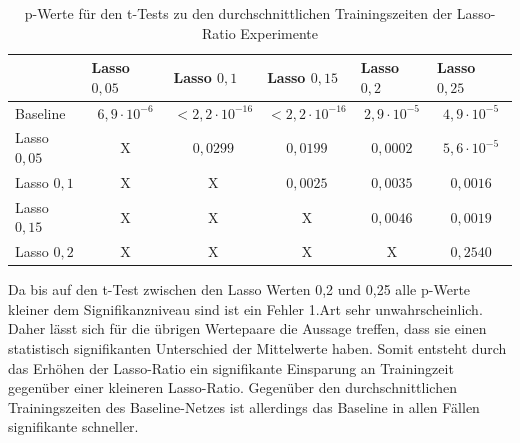 \begin{table}[]
\caption{p-Werte für den t-Tests zu den durchschnittlichen Trainingszeiten der Lasso-Ratio Experimente }
\centering
\begin{tabular}{l|c|c|c|c|c|}
\cline{2-6}
                                 & \multicolumn{1}{l|}{Lasso $0,05$} & \multicolumn{1}{l|}{Lasso $0,1$} & \multicolumn{1}{l|}{Lasso $0,15$} & \multicolumn{1}{l|}{Lasso $0,2$} & \multicolumn{1}{l|}{Lasso $0,25$} \\ \hline
\multicolumn{1}{|l|}{Baseline}                             & $6,9\cdot10^{-6}$   & $<2,2\cdot10^{-16} $   & $<2,2\cdot 10^{-16}$     & $2,9\cdot 10^{-5}$   & $4,9\cdot10^{-5}$    \\ \hline
\multicolumn{1}{|l|}{Lasso $0,05$}                             & X                               & $0,0299$                         & $0,0199$                          & $0,0002$                         & $5,6\cdot 10^{-5}$    \\ \hline
\multicolumn{1}{|l|}{Lasso $0,1$}                             & X                               & X                              & $0,0025$                          & $0,0035$                         & $0,0016$                          \\ \hline
\multicolumn{1}{|l|}{Lasso $0,15$}   & X                               & X                              & X                               & $0,0046$                         & $0,0019$                          \\ \hline
\multicolumn{1}{|l|}{Lasso $0,2$}                             & X                               & X                              & X                               & X                              & \cellcolor[HTML]{FE0000}$0,2540$                          \\ \hline
\end{tabular}
\label{tab:lasso1}
\end{table}
Da bis auf den t-Test zwischen den Lasso Werten 0,2 und 0,25 alle p-Werte kleiner dem Signifikanzniveau sind ist ein Fehler 1.Art sehr unwahrscheinlich. Daher lässt sich für die übrigen Wertepaare die Aussage treffen, dass sie einen statistisch signifikanten Unterschied der Mittelwerte haben. Somit entsteht durch das Erhöhen der Lasso-Ratio ein signifikante Einsparung an Trainingzeit gegenüber einer kleineren Lasso-Ratio. Gegenüber den durchschnittlichen Trainingszeiten des Baseline-Netzes ist allerdings das Baseline in allen Fällen signifikante schneller.  


